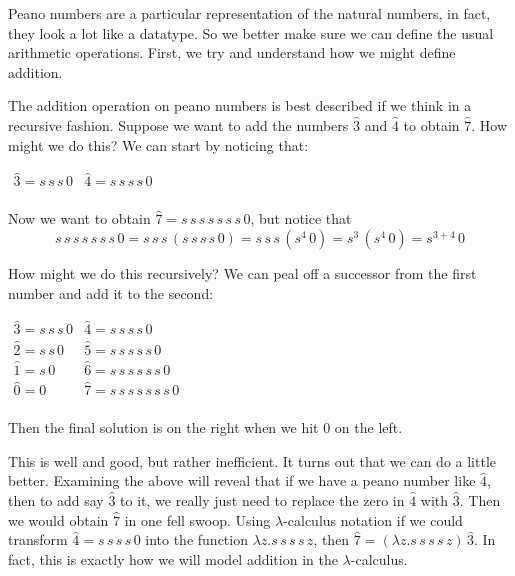 \documentclass{article}
\begin{document}
Peano numbers are a particular representation of the natural numbers,
in fact, they look a lot like a datatype.  So we better make sure we
can define the usual arithmetic operations.  First, we try and
understand how we might define addition.  

The addition operation on peano numbers is best described if we think
in a recursive fashion.  Suppose we want to add the numbers $\hat{3}$
and $\hat{4}$ to obtain $\hat{7}$.  How might we do this?  We can
start by noticing that:
\begin{center}
  \begin{math}
    \begin{array}{lll}
      \hat{3} = s\,s\,s\,0 & \hat{4} = s\,s\,s\,s\,0\\
    \end{array}
  \end{math}
\end{center}
Now we want to obtain $\hat{7} = s\,s\,s\,s\,s\,s\,s\,0$, but notice that 
\[s\,s\,s\,s\,s\,s\,s\,0 = s\,s\,s\,(s\,s\,s\,s\,0) = s\,s\,s\,(s^4\,0) = s^3\,(s^4\,0) = s^{3+4}\,0\]

How might we do this recursively?  We can peal off a successor from
the first number and add it to the second:
\begin{center}
  \begin{math}
    \begin{array}{lll}
      \hat{3} = s\,s\,s\,0 & \hat{4} = s\,s\,s\,s\,0\\
      \hat{2} = s\,s\,0    & \hat{5} = s\,s\,s\,s\,s\,0\\
      \hat{1} = s\,0       & \hat{6} = s\,s\,s\,s\,s\,s\,0\\
      \hat{0} = 0          & \hat{7} = s\,s\,s\,s\,s\,s\,s\,0\\
    \end{array}
  \end{math}
\end{center}
Then the final solution is on the right when we hit $0$ on the left.

This is well and good, but rather inefficient. It turns out that we
can do a little better.  Examining the above will reveal that if we have
a peano number like $\hat{4}$, then to add say $\hat{3}$ to it, we
really just need to replace the zero in $\hat{4}$ with $\hat{3}$.
Then we would obtain $\hat{7}$ in one fell swoop.  Using
$\lambda$-calculus notation if we could transform $\hat{4} =
s\,s\,s\,s\,0$ into the function $\lambda z.s\,s\,s\,s\,z$, then
$\hat{7} = (\lambda z.s\,s\,s\,s\,z)\,\hat{3}$.  In fact, this is
exactly how we will model addition in the $\lambda$-calculus.
\end{document}
